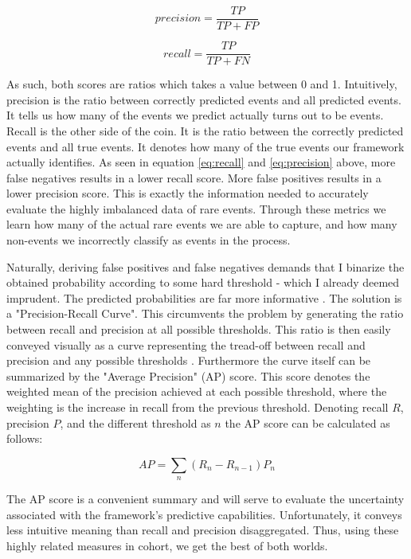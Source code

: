 \documentclass[a4paper]{article}
\begin{document}
\[
precision = \frac{TP}{TP+FP} \tag{2} \label{eq:recall}
\]

\[
recall = \frac{TP}{TP+FN} \tag{3} \label{eq:precision}
\]

As such, both scores are ratios which takes a value between 0 and 1. Intuitively, precision is the ratio between correctly predicted events and all predicted events. It tells us how many of the events we predict actually turns out to be events. Recall is the other side of the coin. It is the ratio between the correctly predicted events and all true events. It denotes how many of the true events our framework actually identifies. As seen in equation \ref{eq:recall} and \ref{eq:precision} above, more false negatives results in a lower recall score. More false positives results in a lower precision score. This is exactly the information needed to accurately evaluate the highly imbalanced data of rare events. Through these metrics we learn how many of the actual rare events we are able to capture, and how many non-events we incorrectly classify as events in the process.\par 

Naturally, deriving false positives and false negatives demands that I binarize the obtained probability according to some hard threshold - which I already deemed imprudent. The predicted probabilities are far more informative \cite{Goldstone_2010}. The solution is a "Precision-Recall Curve". This circumvents the problem by generating the ratio between recall and precision at all possible thresholds. This ratio is then easily conveyed visually as a curve representing the tread-off between recall and precision and any possible thresholds \cite[1278]{He_2008}. Furthermore the curve itself can be summarized by the "Average Precision" (AP) score. This score denotes the weighted mean of the precision achieved at each possible threshold, where the weighting is the increase in recall from the previous threshold. Denoting recall $R$, precision $P$, and the different threshold as $n$ the AP score can be calculated as follows:\par

\[
AP = \sum_n (R_n-R_{n-1})P_n \tag{4} \label{eq:ap}
\]

The AP score is a convenient summary and will serve to evaluate the uncertainty associated with the framework's predictive capabilities. Unfortunately, it conveys less intuitive meaning than recall and precision disaggregated. Thus, using these highly related measures in cohort, we get the best of both worlds.\par
\end{document}
